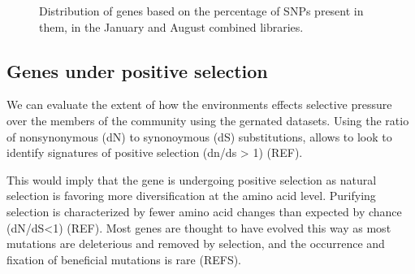 \begin{figure}[h]
\centering
{}
    \hfill
{}
    \caption{Distribution of genes based on the percentage of SNPs present in them, in the January and August combined libraries.}
    \label{SNPs_Boxplot}
\end{figure}


\clearpage
\subsection{Genes under positive selection}

We can evaluate the extent of how the environments effects selective pressure over the  members of the community using the gernated datasets. Using the ratio of nonsynonymous (dN) to synonoymous (dS) substitutions, allows to look to identify signatures of positive selection (dn/ds > 1) (REF).

This would imply that the gene is undergoing positive selection as natural selection is favoring more diversification at the amino acid level. Purifying selection is characterized by fewer amino acid changes than expected by chance (dN/dS<1) (REF). Most genes are thought to have evolved this way as most mutations are deleterious and removed by selection, and the occurrence and fixation of beneficial mutations is rare
(REFS). 







